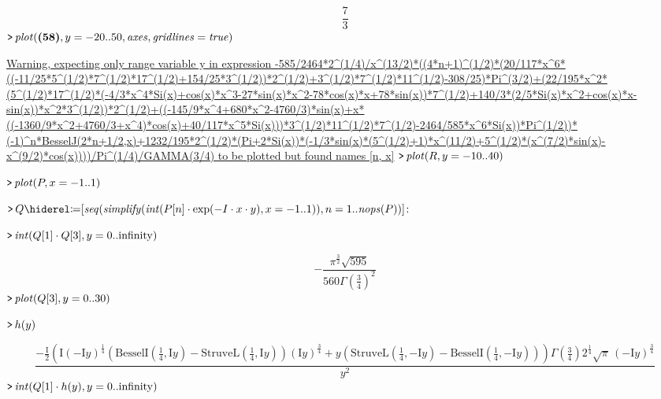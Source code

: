 \documentclass{article}
\begin{document}
\begin{dmath}\label{(59)}
\frac{7}{3}
\end{dmath}
\mapleinput
{$ \displaystyle \texttt{>\,} \mathit{plot} (\mapleref{(58)},y =-20..50,\mathit{axes} ,\mathit{gridlines} =\mathit{true}) $}

\href{http://www.maplesoft.com/support/help/errors/view.aspx?path=Warning,%20expecting%20only%20range%20variable%20y%20in%20expression%20-585%2F2464*2%5E(1%2F4)%2Fx%5E(13%2F2)*((4*n+1)%5E(1%2F2)*(20%2F117*x%5E6*((-11%2F25*5%5E(1%2F2)*7%5E(1%2F2)*17%5E(1%2F2)+154%2F25*3%5E(1%2F2))*2%5E(1%2F2)+3%5E(1%2F2)*7%5E(1%2F2)*11%5}{Warning, expecting only range variable y in expression -585/2464*2^(1/4)/x^(13/2)*((4*n+1)^(1/2)*(20/117*x^6*((-11/25*5^(1/2)*7^(1/2)*17^(1/2)+154/25*3^(1/2))*2^(1/2)+3^(1/2)*7^(1/2)*11^(1/2)-308/25)*Pi^(3/2)+(22/195*x^2*(5^(1/2)*17^(1/2)*(-4/3*x^4*Si(x)+cos(x)*x^3-27*sin(x)*x^2-78*cos(x)*x+78*sin(x))*7^(1/2)+140/3*(2/5*Si(x)*x^2+cos(x)*x-sin(x))*x^2*3^(1/2))*2^(1/2)+((-145/9*x^4+680*x^2-4760/3)*sin(x)+x*((-1360/9*x^2+4760/3+x^4)*cos(x)+40/117*x^5*Si(x)))*3^(1/2)*11^(1/2)*7^(1/2)-2464/585*x^6*Si(x))*Pi^(1/2))*(-1)^n*BesselJ(2*n+1/2,x)+1232/195*2^(1/2)*(Pi+2*Si(x))*(-1/3*sin(x)*(5^(1/2)+1)*x^(11/2)+5^(1/2)*(x^(7/2)*sin(x)-x^(9/2)*cos(x))))/Pi^(1/4)/GAMMA(3/4) to be plotted but found names [n, x]}%
\mapleinput
{$ \displaystyle \texttt{>\,} \mathit{plot} (R ,y =-10..40) $}


\mapleinput
{$ \displaystyle \texttt{>\,} \mathit{plot} (P ,x =-1..1) $}


\mapleinput
{$ \displaystyle \texttt{>\,} Q \coloneqq [\mathit{seq} (\mathit{simplify} (\mathit{int} (P [n]\cdot \exp (-I \cdot x \cdot y),x =-1..1)),n =1..\mathit{nops} (P))]\colon  $}

\mapleinput
{$ \displaystyle \texttt{>\,} \mathit{int} (Q [1]\cdot Q [3],y =0..\mathrm{infinity}) $}

\begin{dmath}\label{(60)}
-\frac{\pi^{\frac{3}{2}} \sqrt{595}}{560 \Gamma \! \left(\frac{3}{4}\right)^{2}}
\end{dmath}
\mapleinput
{$ \displaystyle \texttt{>\,} \mathit{plot} (Q [3],y =0..30) $}

\mapleinput
{$ \displaystyle \texttt{>\,} h (y) $}

\begin{dmath}\label{(61)}
\frac{-\frac{\mathrm{I}}{2} \left(\mathrm{I} \left(\mathrm{-I} y \right)^{\frac{1}{4}} \left(\mathrm{BesselI}\! \left(\frac{1}{4},\mathrm{I} y \right)-\mathrm{StruveL}\! \left(\frac{1}{4},\mathrm{I} y \right)\right) \left(\mathrm{I} y \right)^{\frac{3}{4}}+y \left(\mathrm{StruveL}\! \left(\frac{1}{4},\mathrm{-I} y \right)-\mathrm{BesselI}\! \left(\frac{1}{4},\mathrm{-I} y \right)\right)\right) \Gamma \! \left(\frac{3}{4}\right) 2^{\frac{1}{4}} \sqrt{\pi}\, \left(\mathrm{-I} y \right)^{\frac{3}{4}}}{y^{2}}
\end{dmath}
\mapleinput
{$ \displaystyle \texttt{>\,} \mathit{int} (Q [1]\cdot h (y),y =0..\mathrm{infinity}) $}
\end{document}
